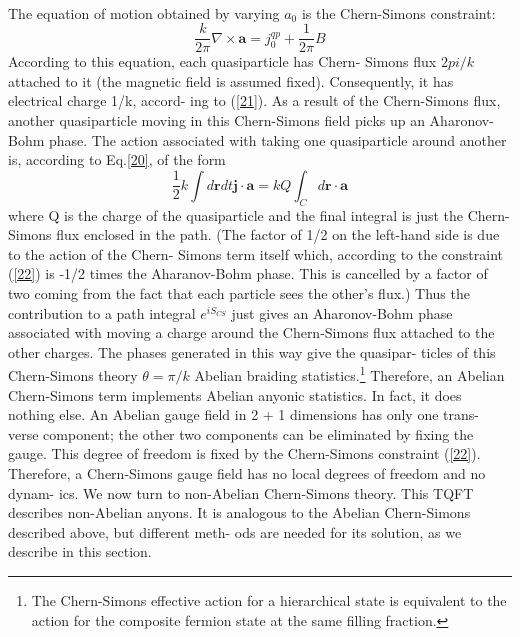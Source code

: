   \paragraph{} The equation of motion obtained by varying $a_{0}$ is the Chern-Simons constraint: 
  \begin{equation}\label{22}
   \dfrac{k}{2\pi}\nabla \times \mathbf{a} = j_{0}^{qp} + \dfrac{1}{2\pi} B
  \end{equation}
According to this equation, each quasiparticle has Chern-
Simons flux $2pi/k$ attached to it (the magnetic field is assumed
fixed). Consequently, it has electrical charge 1/k, accord-
ing to (\ref{21}). As a result of the Chern-Simons flux, another
quasiparticle moving in this Chern-Simons field picks up an
Aharonov-Bohm phase. The action associated with taking
one quasiparticle around another is, according to Eq.\ref{20}, of
the form 
\begin{equation}\label{23}\dfrac{1}{2} k \int d\mathbf{r}dt \mathbf{j} \cdot \mathbf{a} = kQ \int_{C} d\mathbf{r} \cdot \mathbf{a}\end{equation}
where Q is the charge of the quasiparticle and the final integral
is just the Chern-Simons flux enclosed in the path. (The factor
of 1/2 on the left-hand side is due to the action of the Chern-
Simons term itself which, according to the constraint (\ref{22}) is
-1/2 times the Aharanov-Bohm phase. This is cancelled by a factor of 
two coming from the fact that each particle sees the other's flux.) 
Thus the contribution to a path integral $e^{iS_{CS}}$
just gives an Aharonov-Bohm phase associated with moving
a charge around the Chern-Simons flux attached to the other
charges. The phases generated in this way give the quasipar-
ticles of this Chern-Simons theory $\theta = \pi/k$ Abelian braiding
statistics.\footnote{The Chern-Simons effective action for a hierarchical state is equivalent to the action for the composite fermion state at the same filling fraction.}
Therefore, an Abelian Chern-Simons term implements
Abelian anyonic statistics. In fact, it does nothing else. An
Abelian gauge field in 2 + 1 dimensions has only one trans-
verse component; the other two components can be eliminated
by fixing the gauge. This degree of freedom is fixed by the
Chern-Simons constraint (\ref{22}). Therefore, a Chern-Simons
gauge field has no local degrees of freedom and no dynam-
ics.
We now turn to non-Abelian Chern-Simons theory. This
TQFT describes non-Abelian anyons. It is analogous to the
Abelian Chern-Simons described above, but different meth-
ods are needed for its solution, as we describe in this section.
